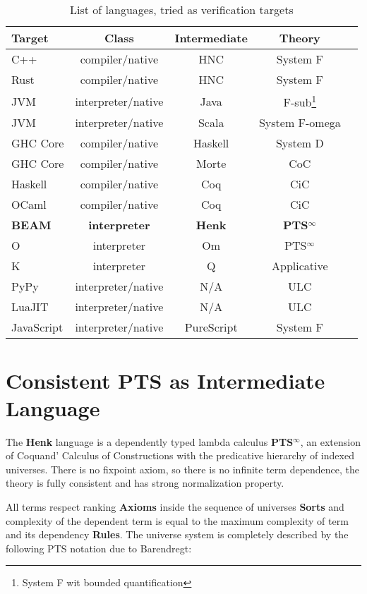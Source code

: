 \documentclass{article}
\begin{document}
\begin{table}[h]
\begin{center}
\caption{List of languages, tried as verification targets}
\label{tab:a}
\begin{tabular}{lcccc}
\hline
{\bf Target} & {\bf Class} & {\bf Intermediate} & {\bf Theory}\\
\hline
C++        & compiler/native      & HNC & System F\\
Rust       & compiler/native      & HNC & System F\\
JVM        & interpreter/native   & Java    & F-sub\footnote{System F wit bounded quantification}\\
JVM        & interpreter/native   & Scala   & System F-omega\\
GHC Core   & compiler/native      & Haskell & System D\\
GHC Core   & compiler/native      & Morte   & CoC\\
Haskell    & compiler/native      & Coq     & CiC\\
OCaml      & compiler/native      & Coq     & CiC\\
{\bf BEAM} & {\bf interpreter} & {\bf Henk}   & {\bf PTS$^\infty$} \\
O          & interpreter          & Om  & PTS$^\infty$ \\
K          & interpreter          & Q   & Applicative \\
PyPy       & interpreter/native   & N/A & ULC \\
LuaJIT     & interpreter/native   & N/A & ULC \\
JavaScript & interpreter/native & PureScript & System F\\
\hline
\end{tabular}
\end{center}
\end{table}

\section{Consistent PTS as Intermediate Language}
The {\bf Henk} language is a dependently typed lambda calculus {\bf PTS$^\infty$}, an extension of Coquand' Calculus of Constructions\cite{Coq88} with the predicative hierarchy of indexed universes.
There is no fixpoint axiom, so there is no infinite term dependence, the theory is fully consistent and has strong normalization property.

All terms respect ranking {\bf Axioms} inside the sequence of universes {\bf Sorts} and complexity of the dependent term is equal to the maximum complexity of term and its dependency {\bf Rules}.
The universe system is completely described by the following PTS notation due to Barendregt\cite{Henk93}:
\end{document}
